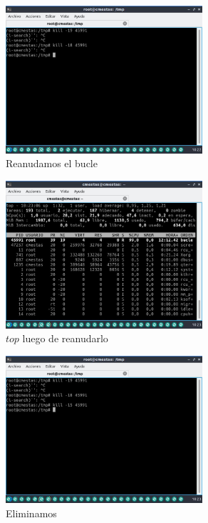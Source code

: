 \documentclass[12pt]{article}
\begin{document}
\begin{figure}[h]
    \centering
    \includegraphics[width=0.65\textwidth]{images/screenA32.jpg}
    \caption{Reanudamos el bucle}
\end{figure}

\begin{figure}[h]
    \centering
    \includegraphics[width=0.65\textwidth]{images/screenA33.jpg}
    \caption{$top$ luego de reanudarlo}
\end{figure}

\begin{figure}[h]
    \centering
    \includegraphics[width=0.65\textwidth]{images/screenA34.jpg}
    \caption{Eliminamos}
\end{figure}
\end{document}
